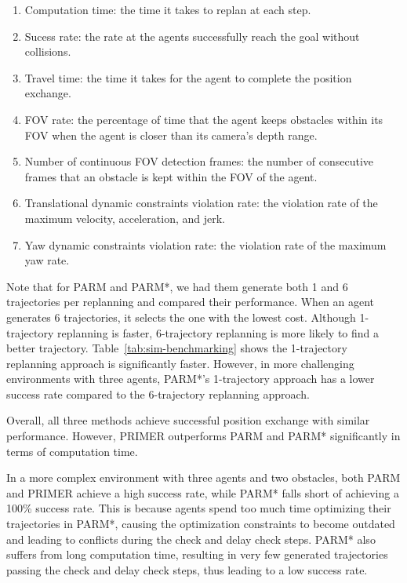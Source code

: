 \begin{enumerate}
    \item Computation time: the time it takes to replan at each step.
    \item Sucess rate: the rate at the agents successfully reach the goal without collisions.
    \item Travel time: the time it takes for the agent to complete the position exchange.
    \item FOV rate: the percentage of time that the agent keeps obstacles within its FOV when the agent is closer than its camera's depth range.
    \item Number of continuous FOV detection frames: the number of consecutive frames that an obstacle is kept within the FOV of the agent.
    \item Translational dynamic constraints violation rate: the violation rate of the maximum velocity, acceleration, and jerk.
    \item Yaw dynamic constraints violation rate: the violation rate of the maximum yaw rate.
\end{enumerate}

Note that for PARM and PARM*, we had them generate both 1 and 6 trajectories per replanning and compared their performance. When an agent generates 6 trajectories, it selects the one with the lowest cost. Although 1-trajectory replanning is faster, 6-trajectory replanning is more likely to find a better trajectory. Table~\ref{tab:sim-benchmarking} shows the 1-trajectory replanning approach is significantly faster. However, in more challenging environments with three agents, PARM*'s 1-trajectory approach has a lower success rate compared to the 6-trajectory replanning approach.

Overall, all three methods achieve successful position exchange with similar performance. However, PRIMER outperforms PARM and PARM* significantly in terms of computation time.

In a more complex environment with three agents and two obstacles, both PARM and PRIMER achieve a high success rate, while PARM* falls short of achieving a 100\% success rate. This is because agents spend too much time optimizing their trajectories in PARM*, causing the optimization constraints to become outdated and leading to conflicts during the check and delay check steps. PARM* also suffers from long computation time, resulting in very few generated trajectories passing the check and delay check steps, thus leading to a low success rate.

